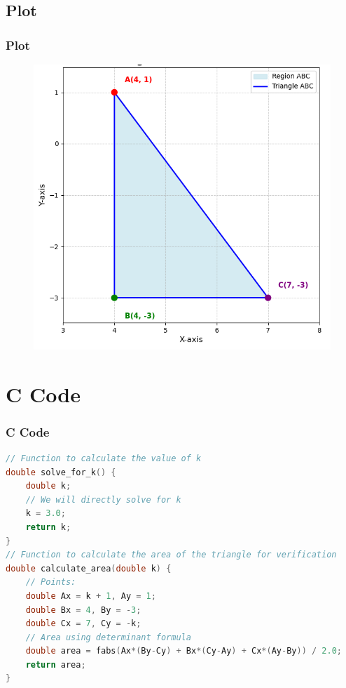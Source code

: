 \documentclass{beamer}
\theoremstyle{remark}
\numberwithin{equation}{section}
\begin{document}
\subsection{Plot}
\begin{frame}[fragile]
\frametitle{Plot}

\begin{figure}[h!]
   \centering
   \includegraphics[width=0.7\columnwidth]{figs/fig.png}
	\caption{}
   \label{stemplot}
\end{figure}
\end{frame}
\section{C Code}
\begin{frame}[fragile]
\frametitle{C Code }
\begin{lstlisting}[language=C]
// Function to calculate the value of k
double solve_for_k() {
    double k;
    // We will directly solve for k
    k = 3.0;
    return k;
}
// Function to calculate the area of the triangle for verification
double calculate_area(double k) {
    // Points:
    double Ax = k + 1, Ay = 1;
    double Bx = 4, By = -3;
    double Cx = 7, Cy = -k;
    // Area using determinant formula
    double area = fabs(Ax*(By-Cy) + Bx*(Cy-Ay) + Cx*(Ay-By)) / 2.0;
    return area;
}
\end{lstlisting}
\end{frame}
\end{document}
